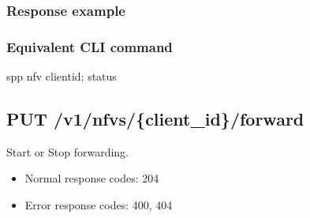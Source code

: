 \documentclass[a4paper,11pt,openany,oneside,english]{sphinxmanual}
\begin{document}
\subsubsection{Response example}
\label{\detokenize{api_ref/spp_nfv:response-example}}
\begin{sphinxVerbatim}[commandchars=\\\{\},formatcom=\footnotesize]
   
   
   \PYG{p}{[}
         
  \PYG{p}{]}
   \PYG{p}{[}
         
         
  \PYG{p}{]}
\end{sphinxVerbatim}


\subsubsection{Equivalent CLI command}
\label{\detokenize{api_ref/spp_nfv:equivalent-cli-command}}
\begin{sphinxVerbatim}[commandchars=\\\{\},formatcom=\footnotesize]
spp \PYGZgt{} nfv \PYGZob{}client\PYGZus{}id\PYGZcb{}; status
\end{sphinxVerbatim}


\subsection{PUT /v1/nfvs/\{client\_id\}/forward}
\label{\detokenize{api_ref/spp_nfv:put-v1-nfvs-client-id-forward}}
Start or Stop forwarding.
\begin{itemize}
\item {} 
Normal response codes: 204

\item {} 
Error response codes: 400, 404

\end{itemize}
\end{document}
